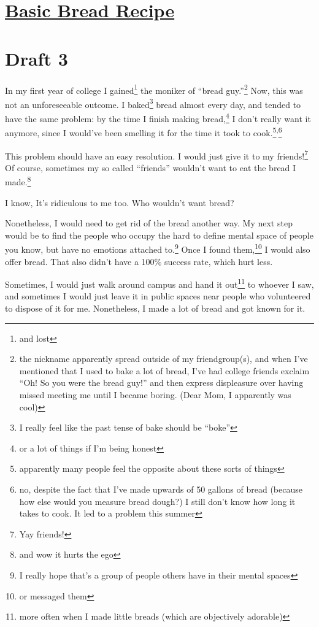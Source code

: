 \documentclass[12pt]{article}[titlepage]
\newcommand{\say}[1]{``#1''}
\newcommand{\1}{\={a}}
\newcommand{\2}{\={e}}
\newcommand{\3}{\={\i}}
\newcommand{\4}{\=o}
\newcommand{\5}{\=u}
\newcommand{\6}{\={A}}
\renewcommand{\,}{\textsuperscript{,}}
\begin{document}
\doublespacing
\section{\href{basic-bread-recipe.html}{Basic Bread Recipe}}

\section{Draft 3}
In my first year of college I gained\footnote{and lost} the moniker of \say{bread guy.}\footnote{the nickname apparently spread outside of my friendgroup(s), and when I've mentioned that I used to bake a lot of bread, I've had college friends exclaim \say{Oh! So you were the bread guy!} and then express displeasure over having missed meeting me until I became boring. (Dear Mom, I apparently was cool)}
Now, this was not an unforeseeable outcome.
I baked\footnote{I really feel like the past tense of bake should be \say{boke}} bread almost every day, and tended to have the same problem: by the time I finish making bread,\footnote{or a lot of things if I'm being honest} I don't really want it anymore, since I would've been smelling it for the time it took to cook.\footnote{apparently many people feel the opposite about these sorts of things}\,\footnote{no, despite the fact that I've made upwards of 50 gallons of bread (because how else would you measure bread dough?) I still don't know how long it takes to cook. It led to a problem this summer}

This problem should have an easy resolution.
I would just give it to my friends!\footnote{Yay friends!}
Of course, sometimes my so called \say{friends} wouldn't want to eat the bread I made.\footnote{and wow it hurts the ego}

I know, It's ridiculous to me too.
Who wouldn't want bread?

Nonetheless, I would need to get rid of the bread another way.
My next step would be to find the people who occupy the hard to define mental space of people you know, but have no emotions attached to.\footnote{I really hope that's a group of people others have in their mental spaces}
Once I found them,\footnote{or messaged them} I would also offer bread.
That also didn't have a 100\% success rate, which hurt less.

Sometimes, I would just walk around campus and hand it out\footnote{more often when I made little breads (which are objectively adorable)} to whoever I saw, and sometimes I would just leave it in public spaces near people who volunteered to dispose of it for me.
Nonetheless, I made a lot of bread and got known for it.
\end{document}
